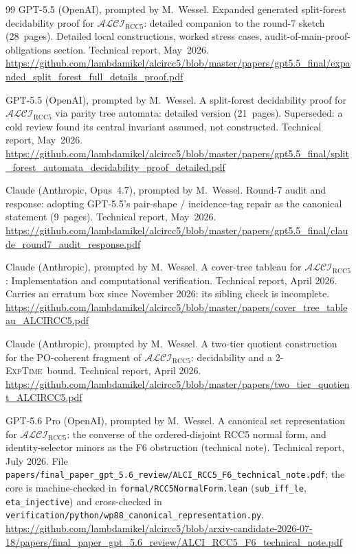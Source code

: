 \documentclass[11pt]{article}
\newcommand{\ALCIRCC}[1]{\mathcal{ALCI}_{\mathrm{RCC#1}}}
\newcommand{\EXPTIME}{\textsc{ExpTime}}
\newcommand{\code}[1]{\texttt{#1}}
\theoremstyle{plain}
\theoremstyle{definition}
\begin{document}
\begin{thebibliography}{99}
GPT-5.5 (OpenAI), prompted by M.\ Wessel.
\newblock Expanded generated split-forest decidability proof for
  $\ALCIRCC{5}$: detailed companion to the round-7 sketch
  (28~pages).  Detailed local constructions, worked stress cases,
  audit-of-main-proof-obligations section.
\newblock Technical report, May~2026.
\newblock \url{https://github.com/lambdamikel/alcircc5/blob/master/papers/gpt5.5_final/expanded_split_forest_full_details_proof.pdf}

GPT-5.5 (OpenAI), prompted by M.\ Wessel.
\newblock A split-forest decidability proof for $\ALCIRCC{5}$ via
  parity tree automata: detailed version (21~pages).  Superseded: a
  cold review found its central invariant assumed, not constructed.
\newblock Technical report, May~2026.
\newblock \url{https://github.com/lambdamikel/alcircc5/blob/master/papers/gpt5.5_final/split_forest_automata_decidability_proof_detailed.pdf}

Claude (Anthropic, Opus~4.7), prompted by M.\ Wessel.
\newblock Round-7 audit and response: adopting GPT-5.5's
  pair-shape / incidence-tag repair as the canonical statement
  (9~pages).
\newblock Technical report, May~2026.
\newblock \url{https://github.com/lambdamikel/alcircc5/blob/master/papers/gpt5.5_final/claude_round7_audit_response.pdf}

Claude (Anthropic), prompted by M.\ Wessel.
\newblock A cover-tree tableau for $\ALCIRCC{5}$:
  Implementation and computational verification.
\newblock Technical report, April 2026. Carries an erratum box since
  November 2026: its sibling check is incomplete.
\newblock \url{https://github.com/lambdamikel/alcircc5/blob/master/papers/cover_tree_tableau_ALCIRCC5.pdf}

Claude (Anthropic), prompted by M.\ Wessel.
\newblock A two-tier quotient construction for the PO-coherent
  fragment of $\ALCIRCC{5}$: decidability and a 2-\EXPTIME\ bound.
\newblock Technical report, April 2026.
\newblock \url{https://github.com/lambdamikel/alcircc5/blob/master/papers/two_tier_quotient_ALCIRCC5.pdf}

GPT-5.6 Pro (OpenAI), prompted by M.\ Wessel.
\newblock A canonical set representation for $\ALCIRCC{5}$: the converse of
  the ordered-disjoint RCC5 normal form, and identity-selector minors as
  the F6 obstruction (technical note).
\newblock Technical report, July 2026.
\newblock File
  \texttt{papers/final\_paper\_gpt\_5.6\_review/ALCI\_RCC5\_F6\_technical\_note.pdf};
  the core is machine-checked in \texttt{formal/RCC5NormalForm.lean}
  (\code{sub\_iff\_le}, \code{eta\_injective}) and cross-checked in
  \texttt{verification/python/wp88\_canonical\_representation.py}.
\newblock \url{https://github.com/lambdamikel/alcircc5/blob/arxiv-candidate-2026-07-18/papers/final_paper_gpt_5.6_review/ALCI_RCC5_F6_technical_note.pdf}


\end{thebibliography}
\end{document}
